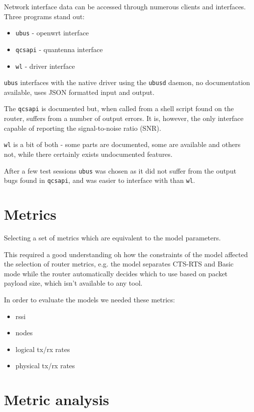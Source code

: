 Network interface data can be accessed through numerous clients and interfaces.
Three programs stand out:

\begin{itemize}
	\item \texttt{ubus} - openwrt interface
	\item \texttt{qcsapi} - quantenna interface
	\item \texttt{wl} - driver interface
\end{itemize}

\texttt{ubus} interfaces with the native driver using the \texttt{ubusd} daemon, no documentation available, uses JSON formatted input and output.

The \texttt{qcsapi} is documented but, when called from a shell script found on the router, suffers from a number of output errors. It is, however, the only interface capable of reporting the signal-to-noise ratio (SNR).

\texttt{wl} is a bit of both - some parts are documented, some are available and
others not, while there certainly exists undocumented features.

After a few test sessions \texttt{ubus} was chosen as it did not suffer from the output bugs found in \texttt{qcsapi}, and was easier to interface with than \texttt{wl}.

\section{Metrics}
Selecting a set of metrics which are equivalent to the model parameters.

This required a good understanding oh how the constraints of the model affected the selection of router metrics, e.g. the model separates CTS-RTS and Basic mode while the router automatically decides which to use based on packet payload size, which isn't available to any tool.

In order to evaluate the models we needed these metrics:

\begin{itemize}
\item rssi
\item nodes
\item logical tx/rx rates
\item physical tx/rx rates
\end{itemize}

\section{Metric analysis}


